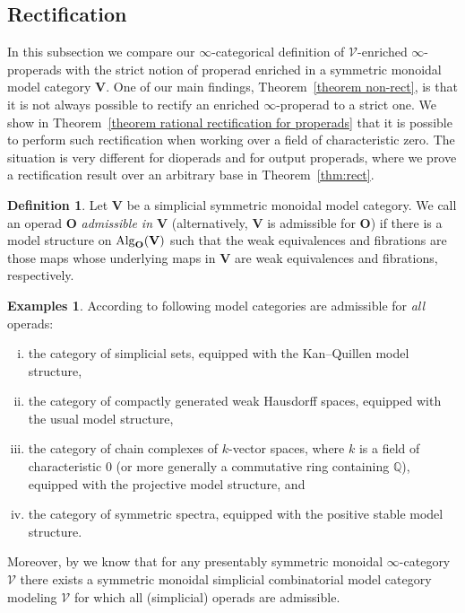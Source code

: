 \documentclass{amsart}
\numberwithin{theorem}{subsection}
\theoremstyle{definition}
\newtheorem{defn}[theorem]{Definition}
\newtheorem{examples}[theorem]{Examples}
\newcommand{\xV}{\mathcal{V}}
\newcommand{\icat}{$\infty$-category}
\newcommand{\name}[1]{\ensuremath{\text{\textup{#1}}}}
\newcommand{\Alg}{\name{Alg}}
\begin{document}
\subsection{Rectification}\label{subsec rect}
In this subsection we compare our $\infty$-categorical definition of $\xV$-enriched $\infty$-properads with the strict notion of properad enriched in a symmetric monoidal model category $\mathbf{V}$.
One of our main findings, Theorem~\ref{theorem non-rect}, is that it is not always possible to rectify an enriched $\infty$-properad to a strict one.
We show in Theorem~\ref{theorem rational rectification for properads} that it is possible to perform such rectification when working over a field of characteristic zero.
The situation is very different for dioperads and for output properads, where we prove a rectification result over an arbitrary base in Theorem~\ref{thm:rect}.

\begin{defn}\label{def admissible}
	Let $\mathbf{V}$ be a simplicial symmetric monoidal model category. 
	We call an operad $\mathbf{O}$ \emph{admissible in $\mathbf{V}$} (alternatively, $\mathbf{V}$ is admissible for $\mathbf{O}$) if there is a model structure on $\Alg_{\mathbf{O}}(\mathbf{V})$ such that the weak equivalences and fibrations are those maps whose underlying maps in $\mathbf{V}$ are weak equivalences and fibrations, respectively.
\end{defn}
\begin{examples}\label{exs:admissible}
	According to \cite[\S
	7]{PavlovScholbachSymm} following model categories are admissible for \emph{all} operads:
	\begin{enumerate}[(i)]
		\item the category of simplicial sets, equipped with the Kan--Quillen model structure,
		\item the category of compactly generated weak Hausdorff spaces, equipped with the usual model structure,
		\item the category of chain complexes of $k$-vector spaces, where $k$ is a field of characteristic $0$ (or more generally a commutative ring containing $\mathbb{Q}$), equipped with the projective model structure, and
		\item the category of symmetric spectra, equipped with the positive stable model structure.
	\end{enumerate}
	Moreover, by \cite{NikolausSagave} we know that for any presentably symmetric monoidal \icat{} $\xV$ there exists a symmetric monoidal simplicial combinatorial model category modeling $\xV$ for which all (simplicial) operads are admissible.
\end{examples}
\end{document}
